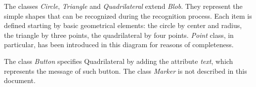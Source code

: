 		The classes \emph{Circle}, \emph{Triangle} and \emph{Quadrilateral} extend \emph{Blob}. They represent the simple shapes that can be recognized during the recognition process. Each item is defined starting by basic geometrical elements: the circle by center and radius, the triangle by three points, the quadrilateral by four points. \emph{Point} class, in particular, has been introduced in this diagram for reasons of completeness. 

		The class \emph{Button} specifies Quadrilateral by adding the attribute \emph{text}, which represents the message of such button. %
		The class \emph{Marker} is not described in this document. 
	
